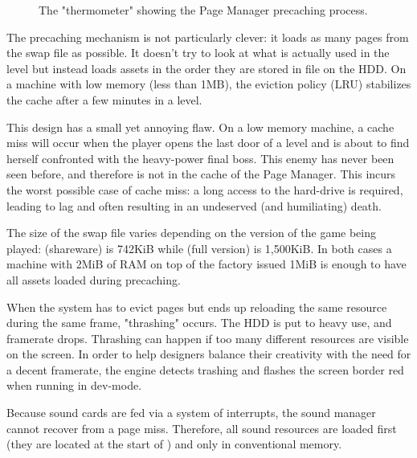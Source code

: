 \documentclass[book.tex]{subfiles}
\begin{document}
 \par
\begin{figure}[H]
\centering
 \caption{The "thermometer" showing the Page Manager precaching process.}
 \end{figure}
 \par
The precaching mechanism is not particularly clever: it loads as many pages from the swap file as possible. It doesn't try to look at what is actually used in the level but instead loads assets in the order they are stored in  file on the HDD. On a machine with low memory (less than 1MB), the eviction policy (LRU) stabilizes the cache after a few minutes in a level.\\
\par
This design has a small yet annoying flaw. On a low memory machine, a cache miss will occur when the player opens the last door of a level and is about to find herself confronted with the heavy-power final boss. This enemy has never been seen before, and therefore is not in the cache of the Page Manager. This incurs the worst possible case of cache miss: a long access to the hard-drive is required, leading to lag and often resulting in an undeserved (and humiliating) death.\\
\par
The size of the swap file varies depending on the version of the game being played:  (shareware) is 742KiB while  (full version) is 1,500KiB. In both cases a machine with 2MiB of RAM on top of the factory issued 1MiB is enough to have all assets loaded during precaching.\\
\par
{} When the system has to evict pages but ends up reloading the same resource during the same frame, "thrashing" occurs. The HDD is put to heavy use, and framerate drops. Thrashing can happen if too many different resources are visible on the screen. In order to help designers balance their creativity with the need for a decent framerate, the engine detects trashing and flashes the screen border red when running in dev-mode.\\
\par
{} Because sound cards are fed via a system of interrupts, the sound manager cannot recover from a page miss. Therefore, all sound resources are loaded first (they are located at the start of ) and only in conventional memory.
\end{document}
